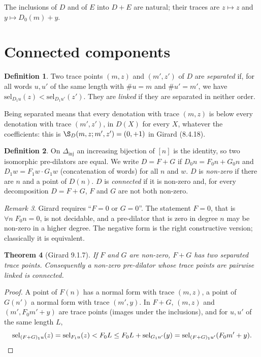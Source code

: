 \documentclass[11pt,a4paper]{article}
\newtheorem{theorem}{Theorem}[section]
\theoremstyle{definition}
\newtheorem{definition}[theorem]{Definition}
\theoremstyle{remark}
\newtheorem{remark}[theorem]{Remark}
\newcommand{\Dinj}{\Delta_{\mathrm{inj}}}
\newcommand{\sel}{\mathrm{sel}}
\begin{document}
The inclusions of $D$ and of $E$ into $D+E$ are natural; their traces are
$z \mapsto z$ and $y \mapsto D_0(m) + y$.

\section{Connected components}

\begin{definition}
Two trace points $(m, z)$ and $(m', z')$ of $D$ are \emph{separated} if,
for all words $u, u'$ of the same length with $\#u = m$ and $\#u' = m'$,
we have $\sel_{D_1 u}(z) < \sel_{D_1 u'}(z')$. They are \emph{linked} if
they are separated in neither order.
\end{definition}

Being separated means that every denotation with trace $(m,z)$ is below
every denotation with trace $(m',z')$, in $D(X)$ for every $X$, whatever
the coefficients: this is $\S_D(m,z;m',z') = (0,+1)$ in Girard (8.4.18).

\begin{definition}
On $\Dinj$ an increasing bijection of $[n]$ is the identity, so two
isomorphic pre-dilators are equal. We write $D = F + G$ if $D_0 n = F_0 n
+ G_0 n$ and $D_1 w = F_1 w \cdot G_1 w$ (concatenation of words) for all
$n$ and $w$. $D$ is \emph{non-zero} if there are $n$ and a point of
$D(n)$. $D$ is \emph{connected} if it is non-zero and, for every
decomposition $D = F + G$, $F$ and $G$ are not both non-zero.
\end{definition}

\begin{remark}
Girard requires ``$F = 0$ or $G = 0$''. The statement $F = 0$, that is
$\forall n\; F_0 n = 0$, is not decidable, and a pre-dilator that is zero
in degree $n$ may be non-zero in a higher degree. The negative form is the
right constructive version; classically it is equivalent.
\end{remark}

\begin{theorem}[Girard 9.1.7]\label{th:917}
If $F$ and $G$ are non-zero, $F + G$ has two separated trace points.
Consequently a non-zero pre-dilator whose trace points are pairwise linked
is connected.
\end{theorem}

\begin{proof}
A point of $F(n)$ has a normal form with trace $(m, z)$, a point of
$G(n')$ a normal form with trace $(m', y)$. In $F + G$, $(m, z)$ and
$(m', F_0 m' + y)$ are trace points (images under the inclusions), and for
$u, u'$ of the same length $L$,
\[
\sel_{(F+G)_1 u}(z) = \sel_{F_1 u}(z) < F_0 L \le F_0 L + \sel_{G_1
u'}(y) = \sel_{(F+G)_1 u'}(F_0 m' + y). \qedhere
\]
\end{proof}
\end{document}
